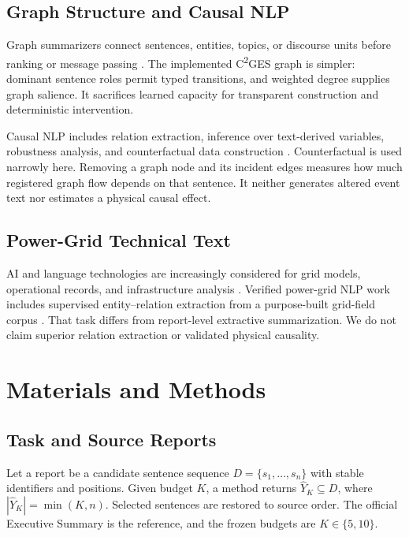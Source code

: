 \documentclass[applsci,article,submit,moreauthors]{Definitions/mdpi}
\newcommand{\cges}{C\textsuperscript{2}GES}
\begin{document}
\subsection{Graph Structure and Causal NLP}

Graph summarizers connect sentences, entities, topics, or discourse units before ranking or message passing \cite{wang2020heterogeneous,cui2020enhancing,jing2021multiplex}. The implemented \cges{} graph is simpler: dominant sentence roles permit typed transitions, and weighted degree supplies graph salience. It sacrifices learned capacity for transparent construction and deterministic intervention.

Causal NLP includes relation extraction, inference over text-derived variables, robustness analysis, and counterfactual data construction \cite{feder2022causal,du2022ecare}. Counterfactual is used narrowly here. Removing a graph node and its incident edges measures how much registered graph flow depends on that sentence. It neither generates altered event text nor estimates a physical causal effect.

\subsection{Power-Grid Technical Text}

AI and language technologies are increasingly considered for grid models, operational records, and infrastructure analysis \cite{xie2022massively,hamann2024foundation,madabhushi2023survey,srinivasan2023artificial}. Verified power-grid NLP work includes supervised entity--relation extraction from a purpose-built grid-field corpus \cite{meng2023gridfield}. That task differs from report-level extractive summarization. We do not claim superior relation extraction or validated physical causality.

\section{Materials and Methods}

\subsection{Task and Source Reports}

Let a report be a candidate sentence sequence $D=\{s_1,\ldots,s_n\}$ with stable identifiers and positions. Given budget $K$, a method returns $\hat{Y}_K\subseteq D$, where $|\hat{Y}_K|=\min(K,n)$. Selected sentences are restored to source order. The official Executive Summary is the reference, and the frozen budgets are $K\in\{5,10\}$.
\end{document}
